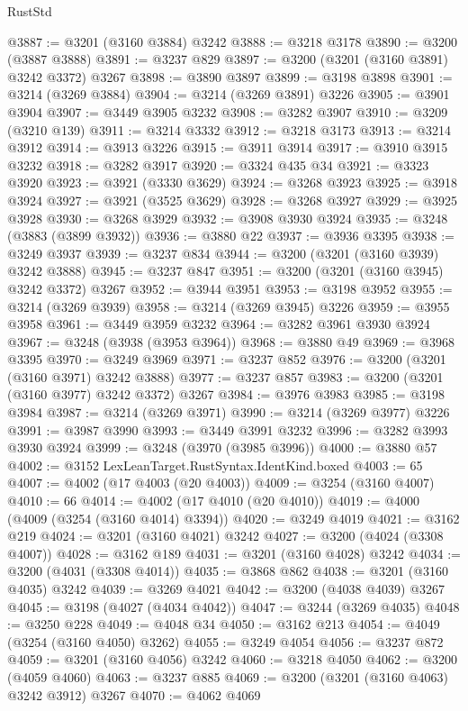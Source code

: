 \begin{lexlean}{RustStd}
\begin{coremodule}
{\begin{coremodule}
{{{{{{{{{{{{{{{{{{{{{{{{{@3887 := @3201 (@3160 @3884) @3242
@3888 := @3218 @3178
@3890 := @3200 (@3887 @3888)
@3891 := @3237 @829
@3897 := @3200 (@3201 (@3160 @3891) @3242 @3372) @3267
@3898 := @3890 @3897
@3899 := @3198 @3898
@3901 := @3214 (@3269 @3884)
@3904 := @3214 (@3269 @3891) @3226
@3905 := @3901 @3904
@3907 := @3449 @3905 @3232
@3908 := @3282 @3907
@3910 := @3209 (@3210 @139)
@3911 := @3214 @3332
@3912 := @3218 @3173
@3913 := @3214 @3912
@3914 := @3913 @3226
@3915 := @3911 @3914
@3917 := @3910 @3915 @3232
@3918 := @3282 @3917
@3920 := @3324 @435 @34
@3921 := @3323 @3920
@3923 := @3921 (@3330 @3629)
@3924 := @3268 @3923
@3925 := @3918 @3924
@3927 := @3921 (@3525 @3629)
@3928 := @3268 @3927
@3929 := @3925 @3928
@3930 := @3268 @3929
@3932 := @3908 @3930 @3924
@3935 := @3248 (@3883 (@3899 @3932))
@3936 := @3880 @22
@3937 := @3936 @3395
@3938 := @3249 @3937
@3939 := @3237 @834
@3944 := @3200 (@3201 (@3160 @3939) @3242 @3888)
@3945 := @3237 @847
@3951 := @3200 (@3201 (@3160 @3945) @3242 @3372) @3267
@3952 := @3944 @3951
@3953 := @3198 @3952
@3955 := @3214 (@3269 @3939)
@3958 := @3214 (@3269 @3945) @3226
@3959 := @3955 @3958
@3961 := @3449 @3959 @3232
@3964 := @3282 @3961 @3930 @3924
@3967 := @3248 (@3938 (@3953 @3964))
@3968 := @3880 @49
@3969 := @3968 @3395
@3970 := @3249 @3969
@3971 := @3237 @852
@3976 := @3200 (@3201 (@3160 @3971) @3242 @3888)
@3977 := @3237 @857
@3983 := @3200 (@3201 (@3160 @3977) @3242 @3372) @3267
@3984 := @3976 @3983
@3985 := @3198 @3984
@3987 := @3214 (@3269 @3971)
@3990 := @3214 (@3269 @3977) @3226
@3991 := @3987 @3990
@3993 := @3449 @3991 @3232
@3996 := @3282 @3993 @3930 @3924
@3999 := @3248 (@3970 (@3985 @3996))
@4000 := @3880 @57
@4002 := @3152 LexLeanTarget.RustSyntax.IdentKind.boxed
@4003 := 65
@4007 := @4002 (@17 @4003 (@20 @4003))
@4009 := @3254 (@3160 @4007)
@4010 := 66
@4014 := @4002 (@17 @4010 (@20 @4010))
@4019 := @4000 (@4009 (@3254 (@3160 @4014) @3394))
@4020 := @3249 @4019
@4021 := @3162 @219
@4024 := @3201 (@3160 @4021) @3242
@4027 := @3200 (@4024 (@3308 @4007))
@4028 := @3162 @189
@4031 := @3201 (@3160 @4028) @3242
@4034 := @3200 (@4031 (@3308 @4014))
@4035 := @3868 @862
@4038 := @3201 (@3160 @4035) @3242
@4039 := @3269 @4021
@4042 := @3200 (@4038 @4039) @3267
@4045 := @3198 (@4027 (@4034 @4042))
@4047 := @3244 (@3269 @4035)
@4048 := @3250 @228
@4049 := @4048 @34
@4050 := @3162 @213
@4054 := @4049 (@3254 (@3160 @4050) @3262)
@4055 := @3249 @4054
@4056 := @3237 @872
@4059 := @3201 (@3160 @4056) @3242
@4060 := @3218 @4050
@4062 := @3200 (@4059 @4060)
@4063 := @3237 @885
@4069 := @3200 (@3201 (@3160 @4063) @3242 @3912) @3267
@4070 := @4062 @4069
}}}}}}}}}}}}}}}}}}}}}}}}}
\end{coremodule}}
\end{coremodule}
\end{lexlean}
